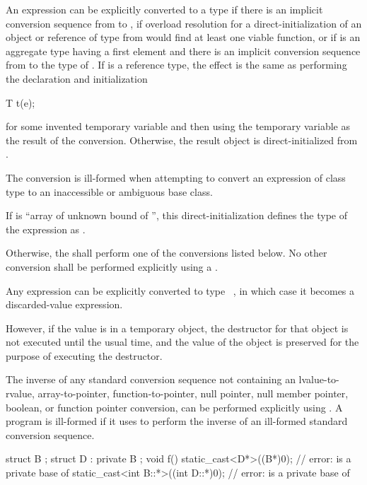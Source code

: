 \pnum
An expression  can be explicitly converted to a type 
if there is an implicit conversion sequence
from  to ,
if overload resolution for a direct-initialization
of an object or reference of type  from 
would find at least one viable function, or
if  is an aggregate type
having a first element  and
there is an implicit conversion sequence
from  to the type of .
If  is a reference type, the effect is
the same as performing the declaration and initialization
\begin{codeblock}
T t(e);
\end{codeblock}
for some invented temporary variable 
and then using the temporary variable as the result of the conversion.
Otherwise, the result object is direct-initialized from .
\begin{note}
The conversion is ill-formed when attempting to convert an
expression of class type to an inaccessible or ambiguous base class.
\end{note}
\begin{note}
If  is ``array of unknown bound of '',
this direct-initialization defines the type of the expression as .
\end{note}

\pnum
Otherwise, the  shall perform one of the conversions
listed below. No other conversion shall be performed explicitly using a
.

\pnum
Any expression can be explicitly converted to type \cv{}~,
in which case it becomes a discarded-value
expression.
\begin{note}
However, if the value is in a temporary
object, the destructor for that
object is
not executed until the usual time, and the value of the object is
preserved for the purpose of executing the destructor.
\end{note}


\pnum
The inverse of any standard conversion sequence not containing an
lvalue-to-rvalue,
array-to-pointer,
function-to-pointer,
null pointer, null member pointer,
boolean, or
function pointer
conversion, can be performed explicitly using . A
program is ill-formed if it uses  to perform the
inverse of an ill-formed standard conversion sequence.
\begin{example}
\begin{codeblock}
struct B { };
struct D : private B { };
void f() {
  static_cast<D*>((B*)0);               // error:  is a private base of 
  static_cast<int B::*>((int D::*)0);   // error:  is a private base of 
}
\end{codeblock}
\end{example}

